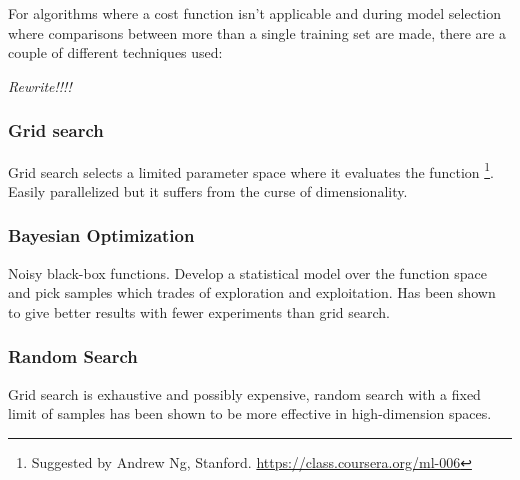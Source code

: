 For algorithms where a cost function isn't applicable and during model selection where comparisons between more than a single training set are made, there are a couple of different techniques used:

\textit{Rewrite!!!!}

\subsubsection{Grid search}

Grid search selects a limited parameter space where it evaluates the function \footnote{Suggested by Andrew Ng, Stanford. \url{https://class.coursera.org/ml-006}}. Easily parallelized but it suffers from the curse of dimensionality.


\subsubsection{Bayesian Optimization}

Noisy black-box functions. Develop a statistical model over the function space and pick samples which trades of exploration and exploitation. Has been shown \citep{snoek2012practical} to give better results with fewer experiments than grid search.


\subsubsection{Random Search}

Grid search is exhaustive and possibly expensive, random search with a fixed limit of samples has been shown to be more effective in high-dimension spaces. \citep{bergstra2012random}




